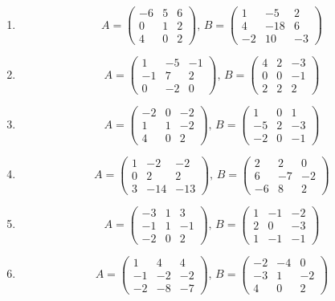 \documentclass{article}
\begin{document}
\begin{enumerate}
\item $$ A = 
\begin{pmatrix}
-6 & 5 & 6 \\ 
0 & 1 & 2 \\ 
4 & 0 & 2
\end{pmatrix}
,\,
B = 
\begin{pmatrix}
1 & -5 & 2 \\ 
4 & -18 & 6 \\ 
-2 & 10 & -3
\end{pmatrix}
$$
\item $$ A = 
\begin{pmatrix}
1 & -5 & -1 \\ 
-1 & 7 & 2 \\ 
0 & -2 & 0
\end{pmatrix}
,\,
B = 
\begin{pmatrix}
4 & 2 & -3 \\ 
0 & 0 & -1 \\ 
2 & 2 & 2
\end{pmatrix}
$$
\item $$ A = 
\begin{pmatrix}
-2 & 0 & -2 \\ 
1 & 1 & -2 \\ 
4 & 0 & 2
\end{pmatrix}
,\,
B = 
\begin{pmatrix}
1 & 0 & 1 \\ 
-5 & 2 & -3 \\ 
-2 & 0 & -1
\end{pmatrix}
$$
\item $$ A = 
\begin{pmatrix}
1 & -2 & -2 \\ 
0 & 2 & 2 \\ 
3 & -14 & -13
\end{pmatrix}
,\,
B = 
\begin{pmatrix}
2 & 2 & 0 \\ 
6 & -7 & -2 \\ 
-6 & 8 & 2
\end{pmatrix}
$$
\item $$ A = 
\begin{pmatrix}
-3 & 1 & 3 \\ 
-1 & 1 & -1 \\ 
-2 & 0 & 2
\end{pmatrix}
,\,
B = 
\begin{pmatrix}
1 & -1 & -2 \\ 
2 & 0 & -3 \\ 
1 & -1 & -1
\end{pmatrix}
$$
\item $$ A = 
\begin{pmatrix}
1 & 4 & 4 \\ 
-1 & -2 & -2 \\ 
-2 & -8 & -7
\end{pmatrix}
,\,
B = 
\begin{pmatrix}
-2 & -4 & 0 \\ 
-3 & 1 & -2 \\ 
4 & 0 & 2
\end{pmatrix}
$$
\end{enumerate}
\end{document}
